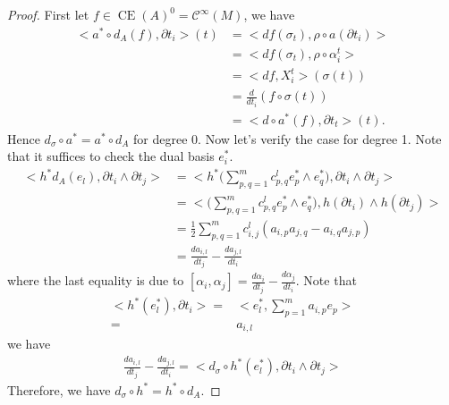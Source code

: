 \documentclass[12pt]{amsart}
\theoremstyle{definition}
\theoremstyle{remark}
\numberwithin{equation}{section}
\newcommand{\del}{\partial}
\renewcommand{\del}{\partial}
\newcommand{\cinf}{{\mathcal C}^{\infty}}
\newcommand{\1}{{\mathbb{1}}}
\newcommand{\CE}{\operatorname{CE}}
\begin{document}
\begin{proof}
First let $f\in \CE(A)^0 = \cinf(M)$, we have 
\begin{align*}
    <a^*\circ d_A(f), \del t_i>(t) &= <df(\sigma_t), \rho\circ a(\del t_i)>\\
    &= <df(\sigma_t), \rho\circ \alpha^t_i>\\
    &= <df, X^t_i>(\sigma(t))\\
    &= \frac{d}{dt_i}(f\circ \sigma(t))\\
    &= <d\circ a^*(f), \del t_t>(t).
\end{align*}
Hence $d_{\sigma} \circ a^* = a^*\circ d_A$ for degree 0.
Now let's verify the case for degree 1. Note that it suffices to check the dual basis $e_i^*$.
\begin{align*}
    <h^*d_A(e_l), \del t_i \wedge \del t_j> &= <h^*\big(\sum_{p,q = 1}^m c^l_{p,q} e^*_p \wedge e^*_q \big), \del t_i \wedge \del t_j >\\
    &= <\big(\sum_{p,q = 1}^m c^l_{p,q} e^*_p \wedge e^*_q \big), h(\del t_i) \wedge h(\del t_j) >\\
    &= \frac{1}{2} \sum_{p,q = 1}^m c^l_{i,j}(a_{i,p}a_{j,q} -a_{i,q}a_{j,p})\\
    &= \frac{d a_{i,l}}{dt_j} - \frac{da_{j,l}}{dt_i}
\end{align*}
where the last equality is due to $[\alpha_i, \alpha_j] =  \frac{d \alpha_i}{d t_j} - \frac{d \alpha_j}{d t_i}$. Note that
\begin{align*}
    <h^*(e_l^*), \del t_i> =& <e_l^*, \sum_{p=1}^m a_{i,p}e_p>\\
    =& a_{i,l}
\end{align*}
we have 
\begin{align*}
    \frac{d a_{i,l}}{dt_j} - \frac{da_{j,l}}{dt_i} = <d_{\sigma}\circ h^*(e_l^*), \del t_i\wedge \del t_j>
\end{align*}
Therefore, we have $d_{\sigma}\circ h^* = h^*\circ d_A$.
\end{proof}
\end{document}
